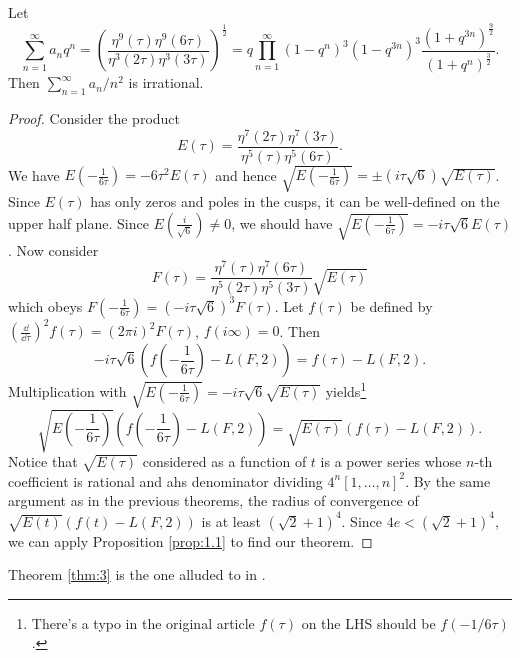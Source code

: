 \begin{theorem}
    \label{thm:3}
    Let
    $$
        \sum_{n=1}^{\infty} a_n q^n = \left(\frac{\eta^9(\tau) \eta^9 (6\tau)}{\eta^3(2\tau) \eta^3(3 \tau)}\right)^{\frac{1}{2}} = q \prod_{n=1}^{\infty} (1 - q^n)^{3} (1 - q^{3n})^{3} \frac{(1 + q^{3n})^{\frac{9}{2}}}{(1 + q^{n})^{\frac{3}{2}}}.
    $$
    Then $\sum_{n=1}^{\infty} a_n / n^{2}$ is irrational.
\end{theorem}

\begin{proof}
    Consider the product
    $$
        E(\tau) = \frac{\eta^7(2\tau) \eta^7(3 \tau)}{\eta^5(\tau) \eta^5(6\tau)}.
    $$
    We have $E(-\frac{1}{6\tau}) = -6 \tau^2 E(\tau)$ and hence $\sqrt{E(-\frac{1}{6\tau})} = \pm (i \tau \sqrt{6}) \sqrt{E(\tau)}$.
    Since $E(\tau)$ has only zeros and poles in the cusps, it can be well-defined on the upper half plane.
    Since $E(\frac{i}{\sqrt{6}}) \ne 0$, we should have $\sqrt{E(-\frac{1}{6\tau})} = -i \tau \sqrt{6} E(\tau)$. Now consider
    $$
        F(\tau) = \frac{\eta^7(\tau) \eta^7(6\tau)}{\eta^5(2\tau) \eta^5(3\tau)} \sqrt{E(\tau)}
    $$
    which obeys $F(-\frac{1}{6\tau}) = (-i\tau \sqrt{6})^{3} F(\tau)$.
    Let $f(\tau)$ be defined by $(\frac{\dd}{\dd \tau})^{2} f(\tau) = (2 \pi i)^2 F(\tau)$, $f(i\infty) = 0$.
    Then
    $$
        -i\tau \sqrt{6} \left(f\left(-\frac{1}{6\tau}\right) - L(F, 2)\right) = f(\tau) - L(F, 2).
    $$
    Multiplication with $\sqrt{E(-\frac{1}{6\tau})} = -i\tau \sqrt{6} \sqrt{E(\tau)}$ yields\footnote{There's a typo in the original article $f(\tau)$ on the LHS should be $f(-1/6\tau)$.}
    $$
        \sqrt{E\left(-\frac{1}{6 \tau}\right)} \left(f\left(-\frac{1}{6\tau}\right) - L(F, 2)\right) = \sqrt{E(\tau)} (f(\tau) - L(F, 2)).
    $$
    Notice that $\sqrt{E(\tau)}$ considered as a function of $t$ is a power series whose $n$-th coefficient is rational and ahs denominator dividing $4^n [1, \dots, n]^2$.
    By the same argument as in the previous theorems, the radius of convergence of $\sqrt{E(t)} (f(t) - L(F, 2))$ is at least $(\sqrt{2} + 1)^4$.
    Since $4 e < (\sqrt{2} + 1)^{4}$, we can apply Proposition \ref{prop:1.1} to find our theorem.
\end{proof}

\begin{remark*}
    Theorem \ref{thm:3} is the one alluded to in \cite{beukers1982irrationality}.
\end{remark*}
